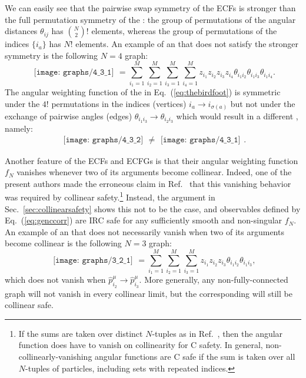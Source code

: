 \documentclass[letterpaper,11pt]{article}
\DeclareRobustCommand{\Sec}[1]{Sec.~\ref{#1}}
\DeclareRobustCommand{\Eq}[1]{Eq.~(\ref{#1})}
\DeclareRobustCommand{\Ref}[1]{Ref.~\cite{#1}}
\newcommand{\B}{\text{EFP}\xspace}
\newcommand{\Bs}{\text{EFPs}\xspace}
\begin{document}
We can easily see that the pairwise swap symmetry of the ECFs is stronger than the full permutation symmetry of the \Bs: the group of permutations of the angular distances $\theta_{ij}$ has $\binom{N}{2}!$ elements, whereas the group of permutations of the indices $\{i_a\}$ has $N!$ elements.
%
An example of an \B that does not satisfy the stronger symmetry is the following $N=4$ graph:
\begin{equation}\label{eq:thebirdfoot}
\begin{gathered}
\texttt{[image: graphs/4\_3\_1]}
\end{gathered}
= \sum_{i_1=1}^M\sum_{i_2=1}^M\sum_{i_3=1}^M \sum_{i_4=1}^M z_{i_1}z_{i_2}z_{i_3} z_{i_4} \theta_{i_1i_2}\theta_{i_1 i_3}\theta_{i_1i_4}.
\end{equation}
%
The angular weighting function of the \B in \Eq{eq:thebirdfoot} is symmetric under the $4!$ permutations in the indices (vertices) $i_a \to i_{\sigma(a)}$ but not under the exchange of pairwise angles (edges) $\theta_{i_1 i_3} \to \theta_{i_2 i_3}$ which would result in a different \B, namely:
\begin{equation}
\begin{gathered}
\texttt{[image: graphs/4\_3\_2]}
\end{gathered}
\neq
\begin{gathered}
\texttt{[image: graphs/4\_3\_1]}
\end{gathered}.
\end{equation}

Another feature of the ECFs and ECFGs is that their angular weighting function $f_N$ vanishes whenever two of its arguments become collinear.
%
Indeed, one of the present authors made the erroneous claim in \Ref{Moult:2016cvt} that this vanishing behavior was required by collinear safety.\footnote{If the sums are taken over distinct $N$-tuples as in \Ref{Moult:2016cvt}, then the angular function does have to vanish on collinearity for C safety. In general, non-collinearly-vanishing angular functions are C safe if the sum is taken over all $N$-tuples of particles, including sets with repeated indices.}
%
Instead, the argument in \Sec{sec:collinearsafety} shows this not to be the case, and observables defined by \Eq{eq:genccorr} are IRC safe for any sufficiently smooth and non-singular $f_N$.
%
An example of an \B that does not necessarily vanish when two of its arguments become collinear is the following $N=3$ graph:
\begin{equation}\label{eq:thewedge}
\begin{gathered}
\texttt{[image: graphs/3\_2\_1]}
\end{gathered}
= \sum_{i_1=1}^M\sum_{i_2=1}^M\sum_{i_3=1}^M z_{i_1}z_{i_2}z_{i_3}  \theta_{i_1i_2}\theta_{i_1 i_3},
\end{equation}
which does not vanish when $\hat p_{i_2}^\mu\to\hat p_{i_3}^\mu$.  
%
More generally, any non-fully-connected graph will not vanish in every collinear limit, but the corresponding \B will still be collinear safe.
\end{document}
